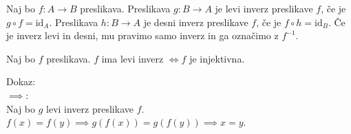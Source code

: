 \begin{definicija}
    Naj bo $f: A \to B$ preslikava.
    Preslikava $g: B \to A$ je levi inverz preslikave $f$, če je $g \circ f = \text{id}_A$.
    Preslikava $h: B \to A$ je desni inverz preslikave $f$, če je $f \circ h = \text{id}_B$.
    Če je inverz levi in desni, mu pravimo samo inverz in ga označimo z $f^{-1}$.
\end{definicija}

\begin{trditev}
    Naj bo $f$ preslikava.
    $f$ ima levi inverz $\iff f$ je injektivna.
\end{trditev}
Dokaz: \\
$\implies$: \\
Naj bo $g$ levi inverz preslikave $f$.
$f(x) = f(y) \implies g(f(x)) = g(f(y)) \implies x = y$. \\

